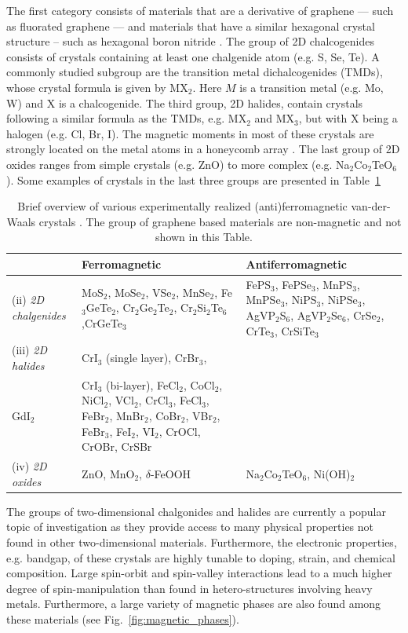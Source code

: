 The first category consists of materials that are a derivative of graphene --- such as fluorated graphene \cite{feng_two-dimensional_2016} --- and materials that have a similar hexagonal crystal structure -- such as hexagonal boron nitride \cite{zhang_two_2017}. The group of 2D chalcogenides consists of crystals containing at least one chalgenide atom (e.g. S, Se, Te). A commonly studied subgroup are the transition metal dichalcogenides (TMDs), whose crystal formula is given by MX$_2$. Here $M$ is a transition metal (e.g. Mo, W) and X is a chalcogenide. The third group, 2D halides, contain crystals following a similar formula as the TMDs, e.g. MX$_2$ and MX$_3$, but with X being a halogen (e.g. Cl, Br, I). The magnetic moments in most of these crystals are strongly located on the metal atoms in a honeycomb array \cite{chittari_carrier-_2020}. The last group of 2D oxides ranges from simple crystals (e.g. ZnO) to more complex (e.g. Na$_2$Co$_2$TeO$_6$). Some examples of crystals in the last three groups are presented in Table~\ref{table:crystals}
\begin{table}[bt]
    \centering
    \begin{tabular}{l>{\raggedright}p{4cm}>{\raggedright\arraybackslash}p{4cm}}
     &  \textbf{Ferromagnetic}  &  \textbf{Antiferromagnetic}\\\midrule
       (ii)  \textit{2D chalgenides}   &  
       MoS$_2$, MoSe$_2$, VSe$_2$, MnSe$_2$, Fe$_3$GeTe$_2$, Cr$_2$Ge$_2$Te$_2$, Cr$_2$Si$_2$Te$_6$,CrGeTe$_3$
        & 
       FePS$_3$, FePSe$_3$, MnPS$_3$,  MnPSe$_3$, NiPS$_3$, NiPSe$_3$, AgVP$_2$S$_6$, AgVP$_2$Se$_6$,  CrSe$_2$, CrTe$_3$, CrSiTe$_3$
       \\\midrule
       (iii) \textit{2D halides}
        & 
       CrI$_3$ (single layer), CrBr$_3$, \\ GdI$_2$
        & 
       CrI$_3$ (bi-layer), FeCl$_2$, CoCl$_2$,  NiCl$_2$, VCl$_2$, CrCl$_3$, FeCl$_3$,  FeBr$_2$,   MnBr$_2$, CoBr$_2$, VBr$_2$,  FeBr$_3$, FeI$_2$, VI$_2$, CrOCl,  CrOBr, CrSBr
       \\\midrule
       (iv)  \textit{2D oxides}     &  ZnO, MnO$_2$, $\delta$-FeOOH  &  Na$_2$Co$_2$TeO$_6$, Ni(OH)$_2$
    \end{tabular}
    \caption{Brief overview of various experimentally realized (anti)ferromagnetic van-der-Waals crystals \cite{sethulakshmi_magnetism_2019,tsymbal_spintronics_2019, liu_chapter_2020}. The group of graphene based materials are non-magnetic and not shown in this Table. }
    \label{table:crystals}
\end{table}
The groups of two-dimensional chalgonides and halides are currently a popular topic of investigation as they provide access to many physical properties not found in other two-dimensional materials. Furthermore, the electronic properties, e.g. bandgap, of these crystals are highly tunable to doping, strain, and chemical composition. Large spin-orbit and spin-valley interactions lead to a much higher degree of spin-manipulation than found in hetero-structures involving heavy metals. Furthermore, a large variety of magnetic phases are also found among these materials (see Fig.~\ref{fig:magnetic_phases}).

